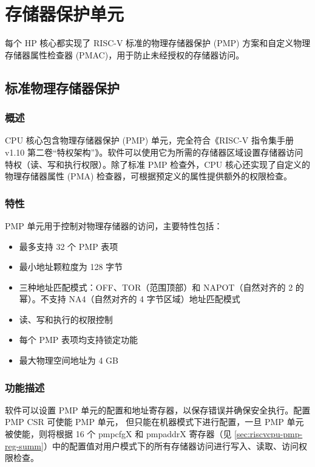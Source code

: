 \documentclass[main\_\_CN.tex]{subfiles}
\begin{document}
\section{存储器保护单元}
每个 HP 核心都实现了 RISC-V 标准的物理存储器保护 (PMP) 方案和自定义物理存储器属性检查器 (PMAC)，用于防止未经授权的存储器访问。


\subsection{标准物理存储器保护}
\label{sec:riscvcpu-pmp}
\subsubsection{概述}
\label{sec:riscvcpu-pmp-overview}
CPU 核心包含物理存储器保护 (PMP) 单元，完全符合《RISC-V 指令集手册 v1.10 第二卷“特权架构”》。软件可以使用它为所需的存储器区域设置存储器访问特权（读、写和执行权限）。除了标准 PMP 检查外，CPU 核心还实现了自定义的物理存储器属性 (PMA) 检查器，可根据预定义的属性提供额外的权限检查。

\subsubsection{特性}
\label{sec:riscvcpu-pmp-features}

PMP 单元用于控制对物理存储器的访问，主要特性包括：

\begin{itemize}
    \item 最多支持 32 个 PMP 表项
    \item 最小地址颗粒度为 128 字节
    \item 三种地址匹配模式：OFF、TOR（范围顶部）和 NAPOT（自然对齐的 2 的幂）。不支持 NA4（自然对齐的 4 字节区域）地址匹配模式
    \item 读、写和执行的权限控制
    \item 每个 PMP 表项均支持锁定功能
    \item 最大物理空间地址为 4 GB
\end{itemize}

\subsubsection{功能描述}
\label{sec:riscvcpu-pmp-func-descr}

软件可以设置 PMP 单元的配置和地址寄存器，以保存错误并确保安全执行。配置 PMP CSR 可使能 PMP 单元， 但只能在机器模式下进行配置，一旦 PMP 单元被使能，则将根据 16 个 pmpcfgX 和 pmpaddrX 寄存器（见 \ref{sec:riscvcpu-pmp-reg-summ}）中的配置值对用户模式下的所有存储器访问进行写入、读取、访问权限检查。
\end{document}
